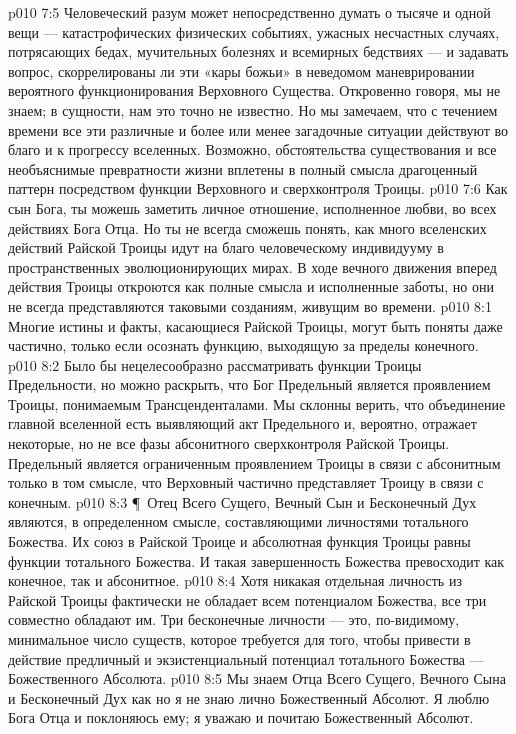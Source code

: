 \vs p010 7:5 Человеческий разум может непосредственно думать о тысяче и одной вещи --- катастрофических физических событиях, ужасных несчастных случаях, потрясающих бедах, мучительных болезнях и всемирных бедствиях --- и задавать вопрос, скоррелированы ли эти «кары божьи» в неведомом маневрировании вероятного функционирования Верховного Существа. Откровенно говоря, мы не знаем; в сущности, нам это точно не известно. Но мы замечаем, что с течением времени все эти различные и более или менее загадочные ситуации  действуют во благо и к прогрессу вселенных. Возможно, обстоятельства существования и все необъяснимые превратности жизни вплетены в полный смысла драгоценный паттерн посредством функции Верховного и сверхконтроля Троицы.
\vs p010 7:6 Как сын Бога, ты можешь заметить личное отношение, исполненное любви, во всех действиях Бога Отца. Но ты не всегда сможешь понять, как много вселенских действий Райской Троицы идут на благо человеческому индивидууму в пространственных эволюционирующих мирах. В ходе вечного движения вперед действия Троицы откроются как полные смысла и исполненные заботы, но они не всегда представляются таковыми созданиям, живущим во времени.
\vs p010 8:1 Многие истины и факты, касающиеся Райской Троицы, могут быть поняты даже частично, только если осознать функцию, выходящую за пределы конечного.
\vs p010 8:2 Было бы нецелесообразно рассматривать функции Троицы Предельности, но можно раскрыть, что Бог Предельный является проявлением Троицы, понимаемым Трансценденталами. Мы склонны верить, что объединение главной вселенной есть выявляющий акт Предельного и, вероятно, отражает некоторые, но не все фазы абсонитного сверхконтроля Райской Троицы. Предельный является ограниченным проявлением Троицы в связи с абсонитным только в том смысле, что Верховный частично представляет Троицу в связи с конечным.
\vs p010 8:3 \P\ Отец Всего Сущего, Вечный Сын и Бесконечный Дух являются, в определенном смысле, составляющими личностями тотального Божества. Их союз в Райской Троице и абсолютная функция Троицы равны функции тотального Божества. И такая завершенность Божества превосходит как конечное, так и абсонитное.
\vs p010 8:4 Хотя никакая отдельная личность из Райской Троицы фактически не обладает всем потенциалом Божества, все три совместно обладают им. Три бесконечные личности --- это, по\hyp{}видимому, минимальное число существ, которое требуется для того, чтобы привести в действие предличный и экзистенциальный потенциал тотального Божества --- Божественного Абсолюта.
\vs p010 8:5 Мы знаем Отца Всего Сущего, Вечного Сына и Бесконечный Дух как  но я не знаю лично Божественный Абсолют. Я люблю Бога Отца и поклоняюсь ему; я уважаю и почитаю Божественный Абсолют.
